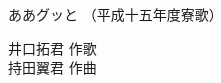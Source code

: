 \documentclass[10pt,b5j]{tarticle} %
\begin{document}
\begin{minipage}[c]{0.7\hsize} %
    \begin{center}
        {\LARGE
            ああグッと %
        }
        {\small 
            （平成十五年度寮歌） %
        }
    \end{center}
\end{minipage}
\begin{minipage}[c]{0.3\hsize} %
    \begin{flushright} %
        井口拓君 作歌\\持田翼君 作曲 %
    \end{flushright}
\end{minipage}
\end{document}
